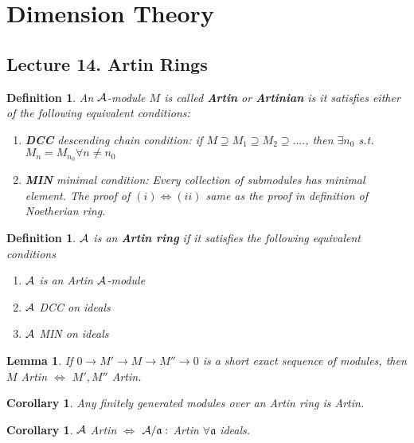 \documentclass[11pt]{article}
\newtheorem{lemma}[thm]{Lemma}
\newtheorem{cor}[thm]{Corollary}
\newtheorem{dfn}[thm]{Definition}
\newcommand{\sca}{{\mathfrak a}}
\newcommand{\cala}{{\cal A}}
\newcommand{\lrta}{\longrightarrow}
\newcommand{\Llrta}{\Longleftrightarrow}
\begin{document}
\section{Dimension Theory}

\subsection{Lecture 14. Artin Rings}
\begin{dfn}
An $\cala$-module $M$ is called \textbf{Artin} or \textbf{Artinian} is it satisfies either of the following equivalent conditions:
\begin{enumerate}[label=(\roman*)]
\item \textbf{DCC} descending chain condition: if $M\supseteq M_1\supseteq M_2\supseteq ....$, then $\exists n_0$ s.t. $M_n=M_{n_0}\forall n\neq n_0$
\item \textbf{MIN} minimal condition: Every collection of submodules has minimal element.
The proof of $(i)\Llrta (ii)$ same as the proof in definition of Noetherian ring.
\end{enumerate}
\end{dfn}

\begin{dfn}
$\cala$ is an \textbf{Artin ring } if it satisfies the following equivalent conditions
\begin{enumerate}[label=(\roman*)]
\item $\cala$ is an Artin $\cala$-module
\item $\cala$ DCC on ideals
\item $\cala$ MIN on ideals
\end{enumerate}
\end{dfn}

\begin{lemma}\label{lem:SES_Artin}
If $0\lrta M'\lrta M\lrta M''\lrta 0$ is a short exact sequence of modules, then $M$ Artin $\Llrta$ $M', M''$ Artin.
\end{lemma}
\begin{cor}
Any finitely generated modules over an Artin ring is Artin.
\end{cor}
\begin{cor}
$\cala$ Artin $\Llrta $ $\cala/\sca:$ Artin $\forall \sca$ ideals.
\end{cor}
\end{document}
